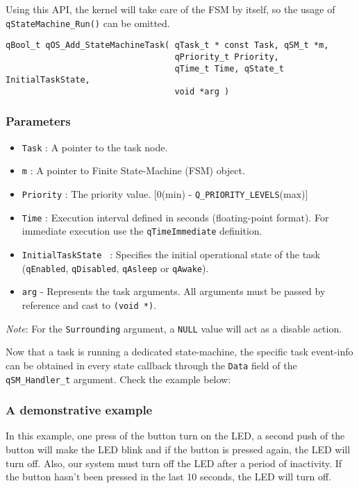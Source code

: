 Using this API, the kernel will take care of the FSM by itself, so the usage of \lstinline{qStateMachine_Run()} can be omitted. 
\medskip

\begin{lstlisting}[style=CStyle]
qBool_t qOS_Add_StateMachineTask( qTask_t * const Task, qSM_t *m, 
                                  qPriority_t Priority, 
                                  qTime_t Time, qState_t InitialTaskState,
                                  void *arg )
\end{lstlisting}

\subsubsection*{Parameters}
\begin{itemize}
    \item \lstinline{Task} : A pointer to the task node. 
    \item \lstinline{m} : A pointer to Finite State-Machine (FSM) object.
    \item \lstinline{Priority} : The priority value. [0(min) - \lstinline{Q_PRIORITY_LEVELS}(max)]
    \item \lstinline{Time} : Execution interval defined in seconds (floating-point format). For immediate execution use the  \lstinline{qTimeImmediate} definition. 
    \item \lstinline{InitialTaskState } : Specifies the initial operational state of the task (\lstinline{qEnabled}, \lstinline{qDisabled}, \lstinline{qAsleep} or \lstinline{qAwake}).
    \item \lstinline{arg} - Represents the task arguments. All arguments must be passed by reference and cast to \lstinline{(void *)}. 
\end{itemize}

\begin{tcolorbox}
\ArrowBoldDownRight \textit{Note}: For the \lstinline{Surrounding} argument, a \lstinline{NULL} value will act as a disable action.
\end{tcolorbox}

Now that a task is running a dedicated state-machine, the specific task event-info can be obtained in every state callback through the \lstinline{Data} field of the \lstinline{qSM_Handler_t} argument. Check the example below:
\medskip



\subsubsection{A demonstrative example} \label{fsm_example}
In this example, one press of the button turn on the LED, a second push of the button will make the LED blink and if the button is pressed again, the LED will turn off. Also, our system must turn off the LED after a period of inactivity. If the button hasn't been pressed in the last 10 seconds, the LED will turn off. 

